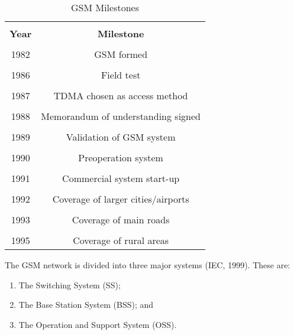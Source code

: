 \documentclass[12pt,svgnames,smaller]{article} %
\begin{document}
	\begin{table}[ht]

		\centering 
		
		\caption{GSM Milestones}
		
		\begin{tabular}{|c|c|}
		
			\hline & \\ [0.5ex] 
			\textbf{Year} & \textbf{Milestone}  \\ 
			\hline
			& \\ [0.5ex] 
			1982 & GSM formed \\
			& \\ [0.5ex] 
			1986 & Field test \\ 
			& \\ [0.5ex] 
			1987 & TDMA chosen as access method \\
			& \\ [0.5ex] 
			1988 & Memorandum of understanding signed \\
			& \\ [0.5ex] 
			1989 & Validation of GSM system \\
			& \\ [0.5ex] 
			1990 & Preoperation system \\
			& \\ [0.5ex] 
			1991 & Commercial system start-up \\
			& \\ [0.5ex] 
			1992 & Coverage of larger cities/airports \\
			& \\ [0.5ex] 
			1993 & Coverage of main roads \\
			& \\ [0.5ex] 
			1995 & Coverage of rural areas \\
			\hline 
			
		\end{tabular} 	
		
		\label{table:GSM_Milestones}
					
	\end{table}

	The GSM network is divided into three major systems (IEC, 1999). These are:

	\begin{enumerate}
		\item The Switching System (SS);
		\item The Base Station System (BSS); and
		\item The Operation and Support System (OSS).
	\end{enumerate}
	
\end{document}
